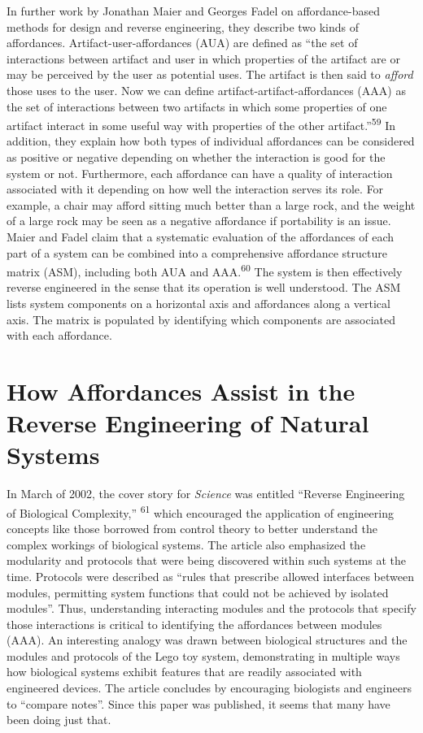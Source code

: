 In further work by Jonathan Maier and Georges Fadel on affordance-based
methods for design and reverse engineering, they describe two kinds of
affordances. Artifact-user-affordances (AUA) are defined as “the set of
interactions between artifact and user in which properties of the
artifact are or may be perceived by the user as potential uses. The
artifact is then said to \textit{afford} those uses to the user. Now we
can define artifact-artifact-affordances (AAA) as the set of
interactions between two artifacts in which some properties of one
artifact interact in some useful way with properties of the other
artifact.”\textsuperscript{59} In addition, they explain how both types
of individual affordances can be considered as positive or negative
depending on whether the interaction is good for the system or not.
Furthermore, each affordance can have a quality of interaction
associated with it depending on how well the interaction serves its
role. For example, a chair may afford sitting much better than a large
rock, and the weight of a large rock may be seen as a negative
affordance if portability is an issue. Maier and Fadel claim that a
systematic evaluation of the affordances of each part of a system can
be combined into a comprehensive affordance structure matrix (ASM),
including both AUA and AAA.\textsuperscript{60} The system is then
effectively reverse engineered in the sense that its operation is well
understood. The ASM lists system components on a horizontal axis and
affordances along a vertical axis. The matrix is populated by
identifying which components are associated with each affordance.

\section{How Affordances Assist in the Reverse Engineering of Natural Systems}

In March of 2002, the cover story for \textit{Science} was entitled
“Reverse Engineering of Biological Complexity,”\textsuperscript{ 61}
which encouraged the application of engineering concepts like those
borrowed from control theory to better understand the complex workings
of biological systems. The article also emphasized the modularity and
protocols that were being discovered within such systems at the time.
Protocols were described as “rules that prescribe allowed interfaces
between modules, permitting system functions that could not be achieved
by isolated modules”. Thus, understanding interacting modules and the
protocols that specify those interactions is critical to identifying
the affordances between modules (AAA). An interesting analogy was drawn
between biological structures and the modules and protocols of the Lego
toy system, demonstrating in multiple ways how biological systems
exhibit features that are readily associated with engineered devices.
The article concludes by encouraging biologists and engineers to
“compare notes”. Since this paper was published, it seems that many
have been doing just that. 


